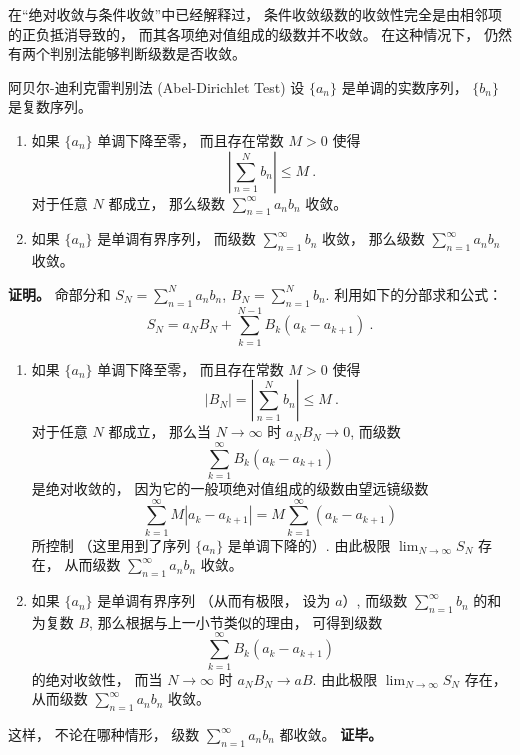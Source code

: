 

在“绝对收敛与条件收敛”中已经解释过， 条件收敛级数的收敛性完全是由相邻项的正负抵消导致的， 而其各项绝对值组成的级数并不收敛。 在这种情况下， 仍然有两个判别法能够判断级数是否收敛。

\begin{theorem}{阿贝尔-迪利克雷判别法 (Abel-Dirichlet Test)}
设 $\{a_n\}$ 是单调的实数序列， $\{b_n\}$ 是复数序列。

\begin{enumerate}
\item 如果 $\{a_n\}$ 单调下降至零， 而且存在常数 $M>0$ 使得
$$
\left|\sum_{n=1}^N b_n\right|\leq M~.
$$
对于任意 $N$ 都成立， 那么级数 $\sum_{n=1}^\infty a_nb_n$ 收敛。

\item 如果 $\{a_n\}$ 是单调有界序列， 而级数 $\sum_{n=1}^\infty b_n$ 收敛， 那么级数 $\sum_{n=1}^\infty a_nb_n$ 收敛。
\end{enumerate}
\end{theorem}

\textbf{证明。} 命部分和 $S_N=\sum_{n=1}^N a_nb_n$, $B_N=\sum_{n=1}^N b_n$. 利用如下的分部求和公式：
$$
S_N=a_NB_N+\sum_{k=1}^{N-1}B_k(a_{k}-a_{k+1})~.
$$


\begin{enumerate}
\item 如果 $\{a_n\}$ 单调下降至零， 而且存在常数 $M>0$ 使得
$$
|B_N|=\left|\sum_{n=1}^N b_n\right|\leq M~.
$$
对于任意 $N$ 都成立， 那么当 $N\to\infty$ 时 $a_NB_N\to0$, 而级数
$$
\sum_{k=1}^{\infty}B_k(a_{k}-a_{k+1})~
$$
是绝对收敛的， 因为它的一般项绝对值组成的级数由望远镜级数
$$
\sum_{k=1}^{\infty}M|a_{k}-a_{k+1}|
=M\sum_{k=1}^{\infty}(a_{k}-a_{k+1})~
$$
所控制 （这里用到了序列 $\{a_n\}$ 是单调下降的）. 由此极限 $\lim_{N\to\infty}S_N$ 存在， 从而级数 $\sum_{n=1}^\infty a_nb_n$ 收敛。

\item 如果 $\{a_n\}$ 是单调有界序列 （从而有极限， 设为 $a$）, 而级数 $\sum_{n=1}^\infty b_n$ 的和为复数 $B$, 那么根据与上一小节类似的理由， 可得到级数
$$
\sum_{k=1}^{\infty}B_k(a_{k}-a_{k+1})~
$$
的绝对收敛性， 而当 $N\to\infty$ 时 $a_NB_N\to aB$. 由此极限 $\lim_{N\to\infty}S_N$ 存在， 从而级数 $\sum_{n=1}^\infty a_nb_n$ 收敛。
\end{enumerate}
这样， 不论在哪种情形， 级数 $\sum_{n=1}^\infty a_nb_n$ 都收敛。 \textbf{证毕。}

